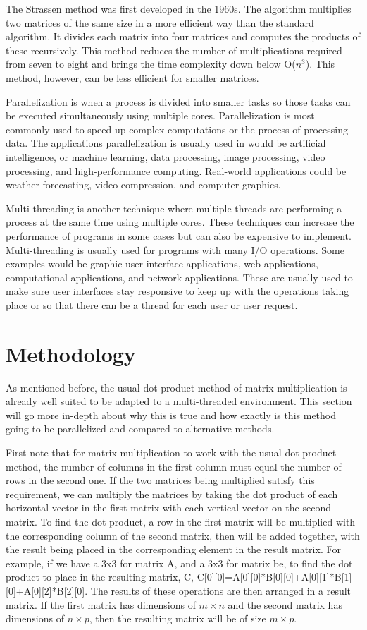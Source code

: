\documentclass[conference]{IEEEtran}
\begin{document}
    The Strassen method was first developed in the 1960s. The algorithm multiplies two matrices of the same size in a more efficient way than the standard algorithm. It divides each matrix into four matrices and computes the products of these recursively. This method reduces the number of multiplications required from seven to eight and brings the time complexity down below O(\(n^3\)). This method, however, can be less efficient for smaller matrices. \cite{website}
    
    Parallelization is when a process is divided into smaller tasks so those tasks can be executed simultaneously using multiple cores. Parallelization is most commonly used to speed up complex computations or the process of processing data. The applications parallelization is usually used in would be artificial intelligence, or machine learning, data processing, image processing, video processing, and high-performance computing. Real-world applications could be weather forecasting, video compression, and computer graphics. 
    
    Multi-threading is another technique where multiple threads are performing a process at the same time using multiple cores. These techniques can increase the performance of programs in some cases but can also be expensive to implement. Multi-threading is usually used for programs with many I/O operations. Some examples would be graphic user interface applications, web applications, computational applications, and network applications. These are usually used to make sure user interfaces stay responsive to keep up with the operations taking place or so that there can be a thread for each user or user request.
\section {Methodology}

    As mentioned before, the usual dot product method of matrix multiplication is already well suited to be adapted to a multi-threaded environment. This section will go more in-depth about why this is true and how exactly is this method going to be parallelized and compared to alternative methods.
    
    First note that for matrix multiplication to work with the usual dot product method, the number of columns in the first column must equal the number of rows in the second one. If the two matrices being multiplied satisfy this requirement, we can multiply the matrices by taking the dot product of each horizontal vector in the first matrix with each vertical vector on the second matrix. To find the dot product, a row in the first matrix will be multiplied with the corresponding column of the second matrix, then will be added together, with the result being placed in the corresponding element in the result matrix. For example, if we have a 3x3 for matrix A, and a 3x3 for matrix be, to find the dot product to place in the resulting matrix, C, C[0][0]=A[0][0]*B[0][0]+A[0][1]*B[1][0]+A[0][2]*B[2][0]. The results of these operations are then arranged in a result matrix. If the first matrix has dimensions of \(m \times n\) and the second matrix has dimensions of \(n \times p\), then the resulting matrix will be of size \(m \times p\). 
    
\end{document}
